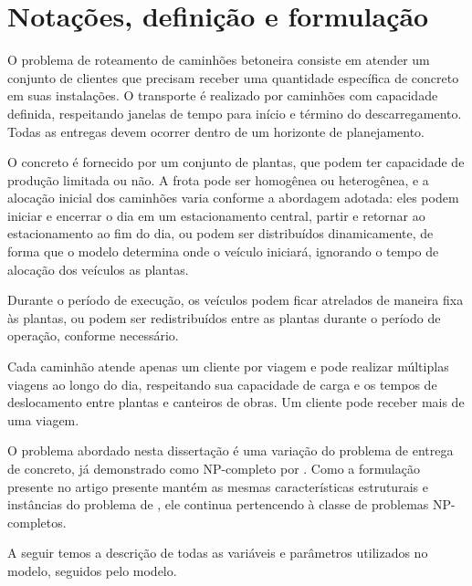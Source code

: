 \chapter{Notações, definição e formulação}
\label{sec:model}



O problema de roteamento de caminhões betoneira consiste em atender um conjunto de clientes que precisam receber uma quantidade específica de concreto em suas instalações. O transporte é realizado por caminhões com capacidade definida, respeitando janelas de tempo para início e término do descarregamento. Todas as entregas devem ocorrer dentro de um horizonte de planejamento.  

O concreto é fornecido por um conjunto de plantas, que podem ter capacidade de produção limitada ou não. A frota pode ser homogênea ou heterogênea, e a alocação inicial dos caminhões varia conforme a abordagem adotada: eles podem iniciar e encerrar o dia em um estacionamento central, partir e retornar ao estacionamento ao fim do dia, ou podem ser distribuídos dinamicamente, de forma que o modelo determina onde o veículo iniciará, ignorando o tempo de alocação dos veículos as plantas.

Durante o período de execução, os veículos podem ficar atrelados de maneira fixa às plantas, ou podem ser redistribuídos entre as plantas durante o período de operação, conforme necessário.  

Cada caminhão atende apenas um cliente por viagem e pode realizar múltiplas viagens ao longo do dia, respeitando sua capacidade de carga e os tempos de deslocamento entre plantas e canteiros de obras.  Um cliente pode receber mais de uma viagem.

O problema abordado nesta dissertação é uma variação do problema de entrega de concreto, já demonstrado como NP-completo por \cite{kinable}. Como a formulação presente no artigo presente mantém as mesmas características estruturais e instâncias do problema de \cite{kinable}, ele continua pertencendo à classe de problemas NP-completos.

A seguir temos a descrição de todas as variáveis e parâmetros utilizados no modelo, seguidos pelo modelo. 


